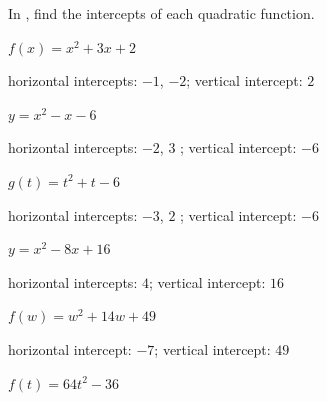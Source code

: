 

In , find the intercepts of each quadratic function.

\begin{exercise}\label{exercise-3.2.1}
$f(x)=x^2+3 x+2$
\end{exercise}


\begin{solution}
    horizontal intercepts: $-1$, $-2$; vertical intercept: $2$
\end{solution}





\begin{exercise}
$y=x^2-x-6$
\end{exercise}

\begin{solution}
    horizontal intercepts: $-2$, $3$ ; vertical intercept: $-6$
\end{solution}





\begin{exercise}
$g(t)=t^2+t-6$
\end{exercise}

\begin{solution}
    horizontal intercepts: $-3$, $2$ ; vertical intercept: $-6$
\end{solution}





\begin{exercise}
 $y=x^2-8 x+16$
 \end{exercise}

 \begin{solution}
     horizontal intercepts: $4$; vertical intercept: $16$
\end{solution}





\begin{exercise}
$f(w)=w^2+14 w+49$
\end{exercise}

\begin{solution}
     horizontal intercept: $-7$; vertical intercept: $49$
\end{solution}





\begin{exercise}
$f(t)=64t^2-36$
\end{exercise}

